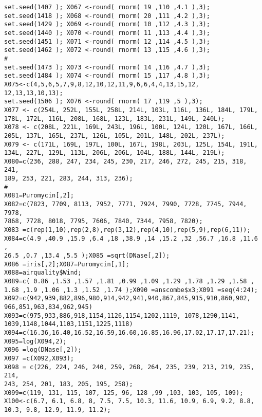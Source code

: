 \documentclass[]{article}
\begin{document}
\begin{verbatim}
set.seed(1407 ); X067 <-round( rnorm( 19 ,110 ,4.1 ),3);
set.seed(1418 ); X068 <-round( rnorm( 20 ,111 ,4.2 ),3);
set.seed(1429 ); X069 <-round( rnorm( 10 ,112 ,4.3 ),3);
set.seed(1440 ); X070 <-round( rnorm( 11 ,113 ,4.4 ),3);
set.seed(1451 ); X071 <-round( rnorm( 12 ,114 ,4.5 ),3);
set.seed(1462 ); X072 <-round( rnorm( 13 ,115 ,4.6 ),3);
#
set.seed(1473 ); X073 <-round( rnorm( 14 ,116 ,4.7 ),3);
set.seed(1484 ); X074 <-round( rnorm( 15 ,117 ,4.8 ),3);
X075<-c(4,5,6,5,7,9,8,12,10,12,11,9,6,6,4,4,13,15,12,
12,13,13,10,13);
set.seed(1506 ); X076 <-round( rnorm( 17 ,119 ,5 ),3);
X077 <- c(254L, 252L, 155L, 258L, 214L, 103L, 116L, 136L, 184L, 179L,
178L, 172L, 116L, 208L, 168L, 123L, 183L, 231L, 149L, 240L);
X078 <- c(208L, 221L, 169L, 243L, 196L, 100L, 124L, 120L, 167L, 166L,
205L, 137L, 165L, 237L, 126L, 105L, 201L, 148L, 202L, 237L);
X079 <- c(171L, 169L, 197L, 100L, 167L, 198L, 203L, 125L, 154L, 191L,
134L, 227L, 129L, 113L, 206L, 206L, 104L, 188L, 144L, 219L);
X080=c(236, 288, 247, 234, 245, 230, 217, 246, 272, 245, 215, 318, 241,
189, 253, 221, 283, 244, 313, 236);
#
X081=Puromycin[,2];
X082=c(7823, 7709, 8113, 7952, 7771, 7924, 7990, 7728, 7745, 7944, 7978,
7868, 7728, 8018, 7795, 7606, 7840, 7344, 7958, 7820);
X083 =c(rep(1,10),rep(2,8),rep(3,12),rep(4,10),rep(5,9),rep(6,11));
X084=c(4.9 ,40.9 ,15.9 ,6.4 ,18 ,38.9 ,14 ,15.2 ,32 ,56.7 ,16.8 ,11.6 ,
26.5 ,0.7 ,13.4 ,5.5 );X085 =sqrt(DNase[,2]);
X086 =iris[,2];X087=Puromycin[,1];
X088=airquality$Wind;
X089=c( 0.86 ,1.53 ,1.57 ,1.81 ,0.99 ,1.09 ,1.29 ,1.78 ,1.29 ,1.58 ,
1.68 ,1.9 ,1.06 ,1.3 ,1.52 ,1.74 );X090 =anscombe$x3;X091 =seq(4:24);
X092=c(942,939,882,896,980,914,942,941,940,867,845,915,910,860,902,
966,851,963,834,962,945)
X093=c(975,933,886,918,1154,1126,1154,1202,1119, 1078,1290,1141,
1039,1148,1044,1103,1151,1225,1118)
X094=c(16.36,16.40,16.52,16.59,16.60,16.85,16.96,17.02,17.17,17.21);
X095=log(X094,2);
X096 =log(DNase[,2]);
X097 =c(X092,X093);
X098 = c(226, 224, 246, 240, 259, 268, 264, 235, 239, 213, 219, 235, 214,
243, 254, 201, 183, 205, 195, 258);
X099=c(119, 131, 115, 107, 125, 96, 128 ,99 ,103, 103, 105, 109);
X100<-c(6.7, 6.1, 6.8, 8, 7.5, 7.5, 10.3, 11.6, 10.9, 6.9, 9.2, 8.8,
10.3, 9.8, 12.9, 11.9, 11.2);


\end{verbatim}
\end{document}

